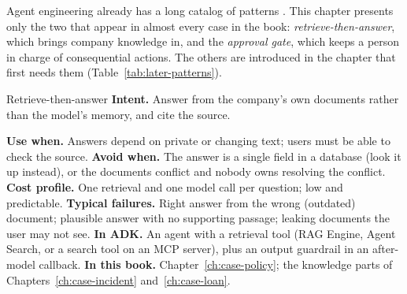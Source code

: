 Agent engineering already has a long catalog of patterns \citep{anthropic2024effective}. This chapter presents only the two that appear in almost every case in the book: \emph{retrieve-then-answer}, which brings company knowledge in, and the \emph{approval gate}, which keeps a person in charge of consequential actions. The others are introduced in the chapter that first needs them (Table~\ref{tab:later-patterns}).


\begin{patterncard}{Retrieve-then-answer}
\textbf{Intent.} Answer from the company's own documents rather than the model's memory, and cite the source.\par\smallskip
\begin{center}
\end{center}
\textbf{Use when.} Answers depend on private or changing text; users must be able to check the source.
\textbf{Avoid when.} The answer is a single field in a database (look it up instead), or the documents conflict and nobody owns resolving the conflict.
\textbf{Cost profile.} One retrieval and one model call per question; low and predictable.
\textbf{Typical failures.} Right answer from the wrong (outdated) document; plausible answer with no supporting passage; leaking documents the user may not see.
\textbf{In ADK.} An agent with a retrieval tool (RAG Engine, Agent Search, or a search tool on an MCP server), plus an output guardrail in an after-model callback.
\textbf{In this book.} Chapter~\ref{ch:case-policy}; the knowledge parts of Chapters~\ref{ch:case-incident} and~\ref{ch:case-loan}.
\end{patterncard}

